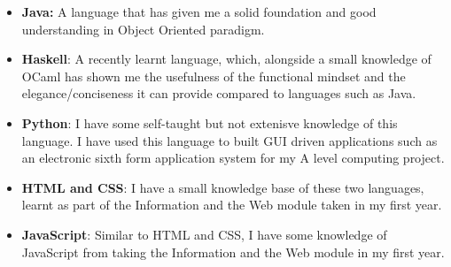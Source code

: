 \documentclass[11pt]{article}
\begin{document}
		\begin{itemize}
			\item \textbf{Java:} A language that has given me a solid foundation and good understanding in Object Oriented paradigm.
			\item \textbf{Haskell}: A recently learnt language, which, alongside a small knowledge of OCaml has shown me the usefulness of the functional mindset and the elegance/conciseness it can provide compared to languages such as Java.
			\item \textbf{Python}: I have some self-taught but not extenisve knowledge of this language. I have used this language to built GUI driven applications such as an electronic sixth form application system for my A level computing project.
			\item \textbf{HTML and CSS}: I have a small knowledge base of these two languages, learnt as part of the Information and the Web module taken in my first year.
			\item \textbf{JavaScript}: Similar to HTML and CSS, I have some knowledge of JavaScript from taking the Information and the Web module in my first year.
		\end{itemize} 
\end{document}
